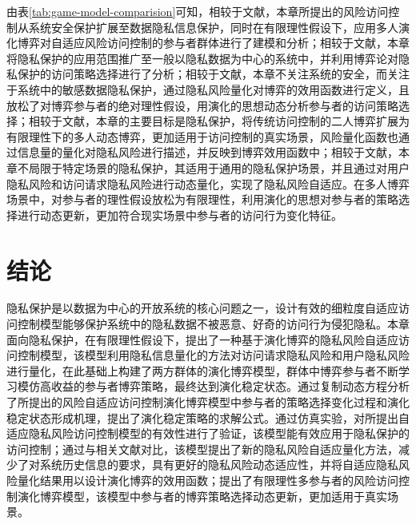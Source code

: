 由表\ref{tab:game-model-comparision}可知，相较于文献\cite{ni2010risk,shaikh2012dynamic,santos2016framework}，本章所提出的风险访问控制从系统安全保护扩展至数据隐私信息保护，同时在有限理性假设下，应用多人演化博弈对自适应风险访问控制的参与者群体进行了建模和分析；相较于文献\cite{wang2011quantified,zhang2018privacy}，本章将隐私保护的应用范围推广至一般以隐私数据为中心的系统中，并利用博弈论对隐私保护的访问策略选择进行了分析；相较于文献\cite{gao2018game,liu2016dynamic}，本章不关注系统的安全，而关注于系统中的敏感数据隐私保护，通过隐私风险量化对博弈的效用函数进行定义，且放松了对博弈参与者的绝对理性假设，用演化的思想动态分析参与者的访问策略选择；相较于文献\cite{helil2017non}，本章的主要目标是隐私保护，将传统访问控制的二人博弈扩展为有限理性下的多人动态博弈，更加适用于访问控制的真实场景，风险量化函数也通过信息量的量化对隐私风险进行描述，并反映到博弈效用函数中；相较于文献\cite{hu2014game}，本章不局限于特定场景的隐私保护，其适用于通用的隐私保护场景，并且通过对用户隐私风险和访问请求隐私风险进行动态量化，实现了隐私风险自适应。在多人博弈场景中，对参与者的理性假设放松为有限理性，利用演化的思想对参与者的策略选择进行动态更新，更加符合现实场景中参与者的访问行为变化特征。
 \section{结论}
隐私保护是以数据为中心的开放系统的核心问题之一，设计有效的细粒度自适应访问控制模型能够保护系统中的隐私数据不被恶意、好奇的访问行为侵犯隐私。本章面向隐私保护，在有限理性假设下，提出了一种基于演化博弈的隐私风险自适应访问控制模型，该模型利用隐私信息量化的方法对访问请求隐私风险和用户隐私风险进行量化，在此基础上构建了两方群体的演化博弈模型，群体中博弈参与者不断学习模仿高收益的参与者博弈策略，最终达到演化稳定状态。通过复制动态方程分析了所提出的风险自适应访问控制演化博弈模型中参与者的策略选择变化过程和演化稳定状态形成机理，提出了演化稳定策略的求解公式。通过仿真实验，对所提出自适应隐私风险访问控制模型的有效性进行了验证，该模型能有效应用于隐私保护的访问控制；通过与相关文献对比，该模型提出了新的隐私风险自适应量化方法，减少了对系统历史信息的要求，具有更好的隐私风险动态适应性，并将自适应隐私风险量化结果用以设计演化博弈的效用函数；提出了有限理性多参与者的风险访问控制演化博弈模型，该模型中参与者的博弈策略选择动态更新，更加适用于真实场景。